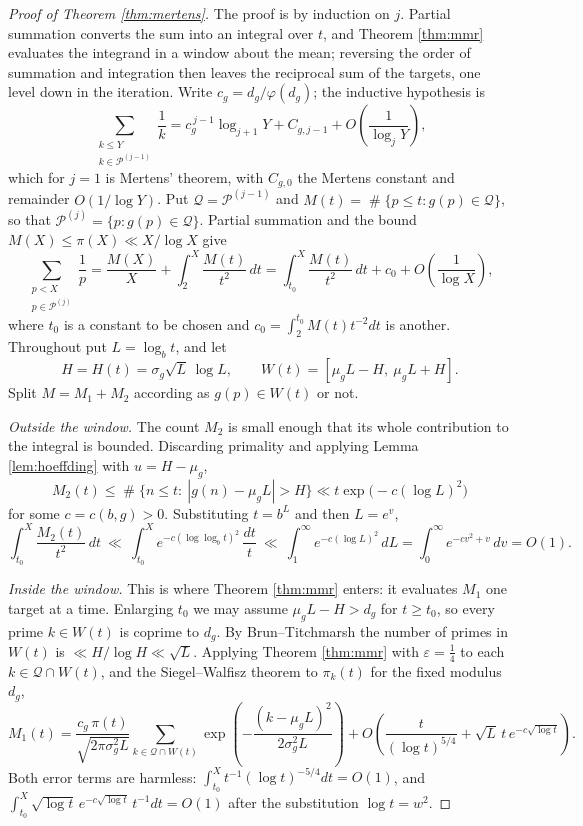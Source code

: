 \documentclass[11pt,reqno]{amsart}
\theoremstyle{plain}
\theoremstyle{definition}
\DeclareMathOperator{\Card}{\#}
\begin{document}
\begin{proof}[Proof of Theorem \ref{thm:mertens}]
The proof is by induction on $j$. Partial summation converts the sum into an integral over $t$, and Theorem \ref{thm:mmr} evaluates the integrand in a window about the mean; reversing the order of summation and integration then leaves the reciprocal sum of the targets, one level down in the iteration. Write $c_g=d_g/\varphi(d_g)$; the inductive hypothesis is
\begin{equation}\label{eq:ind}
\sum_{\substack{k\le Y\\ k\in\mathcal P^{(j-1)}}}\frac1k=c_g^{\,j-1}\log_{j+1}Y+C_{g,j-1}+O\!\left(\frac{1}{\log_{j}Y}\right),
\end{equation}
which for $j=1$ is Mertens' theorem, with $C_{g,0}$ the Mertens constant and remainder $O(1/\log Y)$. Put $\mathcal Q=\mathcal P^{(j-1)}$ and $M(t)=\Card\{p\le t: g(p)\in\mathcal Q\}$, so that $\mathcal P^{(j)}=\{p: g(p)\in\mathcal Q\}$. Partial summation and the bound $M(X)\le\pi(X)\ll X/\log X$ give
\[
\sum_{\substack{p<X\\ p\in\mathcal P^{(j)}}}\frac1p=\frac{M(X)}{X}+\int_2^X\frac{M(t)}{t^2}\,dt=\int_{t_0}^X\frac{M(t)}{t^{2}}\,dt+c_0+O\!\left(\frac{1}{\log X}\right),
\]
where $t_0$ is a constant to be chosen and $c_0=\int_2^{t_0}M(t)t^{-2}dt$ is another. Throughout put $L=\log_bt$, and let
\[
H=H(t)=\sigma_g\sqrt{L}\,\log L,\qquad W(t)=[\mu_gL-H,\ \mu_gL+H].
\]
Split $M=M_1+M_2$ according as $g(p)\in W(t)$ or not.

\emph{Outside the window.} The count $M_2$ is small enough that its whole contribution to the integral is bounded. Discarding primality and applying Lemma \ref{lem:hoeffding} with $u=H-\mu_g$,
\[
M_2(t)\le\Card\{n\le t:\ |g(n)-\mu_gL|>H\}\ll t\exp\big(-c(\log L)^{2}\big)
\]
for some $c=c(b,g)>0$. Substituting $t=b^{L}$ and then $L=e^{v}$,
\[
\int_{t_0}^{X}\frac{M_2(t)}{t^{2}}\,dt\ \ll\ \int_{t_0}^{X}e^{-c(\log\log_bt)^{2}}\,\frac{dt}{t}\ \ll\ \int_{1}^{\infty}e^{-c(\log L)^{2}}\,dL=\int_{0}^{\infty}e^{-cv^{2}+v}\,dv=O(1).
\]

\emph{Inside the window.} This is where Theorem \ref{thm:mmr} enters: it evaluates $M_1$ one target at a time. Enlarging $t_0$ we may assume $\mu_gL-H>d_g$ for $t\ge t_0$, so every prime $k\in W(t)$ is coprime to $d_g$. By Brun--Titchmarsh the number of primes in $W(t)$ is $\ll H/\log H\ll\sqrt{L}$. Applying Theorem \ref{thm:mmr} with $\varepsilon=\frac14$ to each $k\in\mathcal Q\cap W(t)$, and the Siegel--Walfisz theorem to $\pi_k(t)$ for the fixed modulus $d_g$,
\[
M_1(t)=\frac{c_g\,\pi(t)}{\sqrt{2\pi\sigma_g^{2}L}}\sum_{k\in\mathcal Q\cap W(t)}\exp\left(-\frac{(k-\mu_gL)^{2}}{2\sigma_g^{2}L}\right)+O\left(\frac{t}{(\log t)^{5/4}}+\sqrt{L}\,t\,e^{-c\sqrt{\log t}}\right).
\]
Both error terms are harmless: $\int_{t_0}^{X}t^{-1}(\log t)^{-5/4}dt=O(1)$, and $\int_{t_0}^{X}\sqrt{\log t}\,e^{-c\sqrt{\log t}}\,t^{-1}dt=O(1)$ after the substitution $\log t=w^{2}$.


\end{proof}
\end{document}
